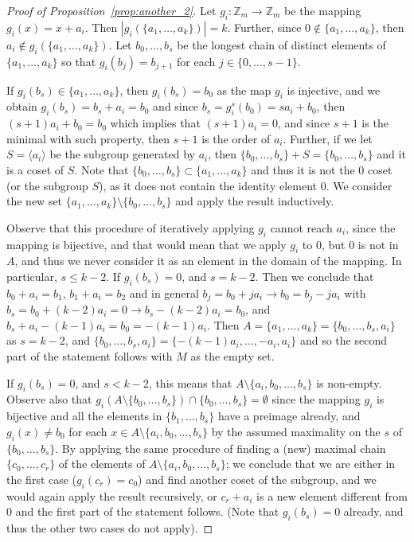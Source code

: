 \documentclass[11pt]{amsart}
\theoremstyle{definition}
\begin{document}
\begin{proof}[Proof of Proposition~\ref{prop:another_2}]
	Let $g_i:\mathbb{Z}_m\to \mathbb{Z}_m$ be the mapping $g_i(x)=x+a_i$. Then $|g_i(\{a_1,\allowbreak \ldots,a_k\})|=k$. Further, since $0\notin \{a_1,\ldots,a_k\}$, then $a_i\notin g_i(\{a_1,\ldots,a_k\})$. Let $b_0,\ldots,b_s$ be the longest chain of distinct elements of $\{a_1,\ldots,a_k\}$ so that $g_i(b_{j})=b_{j+1}$ for each $j\in\{0,\ldots,s-1\}$. 


    If $g_i(b_s)\in \{a_1,\ldots,a_k\}$, then $g_i(b_s)=b_0$ as the map $g_i$ is injective, and we obtain $g_i(b_s)=b_s+a_i=b_0$ and since $b_s=g_i^s(b_0)=sa_i+b_0$, then $(s+1)a_i+b_0=b_0$ which implies that $(s+1)a_i=0$, and since $s+1$ is the minimal with such property, then $s+1$ is the order of $a_i$. Further, if we let $S=\langle a_i\rangle$ be the subgroup generated by $a_i$, then $\{b_0,\ldots,b_s\}+S=\{b_0,\ldots,b_s\}$  and it is a coset of $S$. Note that $\{b_0,\ldots,b_s\}\subset \{a_1,\ldots,a_k\}$ and thus it is not the $0$ coset (or the subgroup $S$), as it does not contain the identity element $0$.
We consider the new set $\{a_1,\ldots,a_k\}\setminus \{b_0,\ldots,b_s\}$ and apply the result inductively.

Observe that this procedure of iteratively applying $g_i$ cannot reach $a_i$, since the mapping is bijective, and that would mean that we apply $g_i$ to $0$, but $0$ is not in $A$, and thus we never consider it as an element in the domain of the mapping. In particular, $s\leq k-2$.
If $g_i(b_s)=0$, and $s=k-2$. Then we conclude that $b_0+a_i=b_1$, $b_1+a_i=b_2$ and in general $b_j=b_0+ja_i \to b_0=b_j-ja_i$ with $b_s=b_0+(k-2)a_i=0 \to b_s-(k-2)a_i=b_0$, and $b_s+a_i-(k-1)a_i=b_0=-(k-1)a_i$. Then $A=\{a_1,\ldots,a_k\}=\{b_0,\ldots,b_s,a_i\}$ as $s=k-2$, and $\{b_0,\ldots,b_s,a_i\}=\{-(k-1)a_i,\ldots,-a_i,a_i\}$ and so the second part of the statement follows with $M$ as the empty set.


If $g_i(b_s)=0$, and $s<k-2$, this means that $A\setminus \{a_i,b_0,\ldots,b_s\}$ is non-empty. Observe also that $g_i(A\setminus \{b_0,\ldots,b_s\})\cap \{b_0,\ldots,b_s\}=\emptyset$ since the mapping $g_i$ is bijective and all the elements in $\{b_1,\ldots,b_s\}$ have a preimage already, and $g_i(x)\neq b_0$ for each $x\in A\setminus \{a_i,b_0,\ldots,b_s\}$ by the assumed maximality on the $s$ of $\{b_0,\ldots,b_s\}$. By applying the same procedure of finding a (new) maximal chain $\{c_0,\ldots,c_r\}$ of the elements of $A\setminus \{a_i,b_0,\ldots,b_s\}$;
we conclude that we are either in the first case ($g_i(c_r)=c_0$) and find another coset of the subgroup, and we would again apply the result recursively, or $c_r+a_i$ is a new element different from $0$ and the first part of the statement follows. (Note that $g_i(b_s)=0$ already, and thus the other two cases do not apply).
\end{proof}
\end{document}
